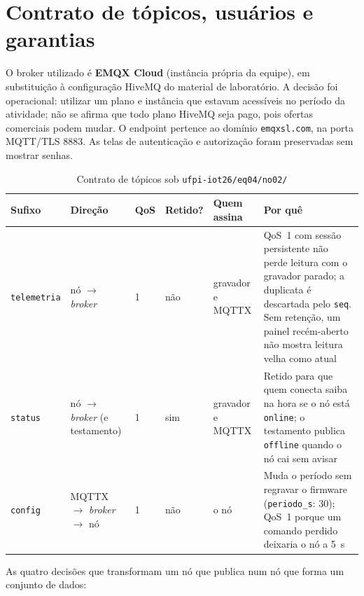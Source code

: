 \section{Contrato de tópicos, usuários e garantias}\label{sec:topicos}
O broker utilizado é \textbf{EMQX Cloud} (instância própria da equipe), em substituição à configuração HiveMQ do material de laboratório. A decisão foi operacional: utilizar um plano e instância que estavam acessíveis no período da atividade; não se afirma que todo plano HiveMQ seja pago, pois ofertas comerciais podem mudar. O endpoint pertence ao domínio \texttt{emqxsl.com}, na porta MQTT/TLS 8883. As telas de autenticação e autorização foram preservadas sem mostrar senhas.
\begin{table}[H]\centering\caption{Contrato de tópicos sob \texttt{ufpi-iot26/eq04/no02/}}\label{tab:topicos}\scriptsize
\setlength{\tabcolsep}{3pt}
\begin{tabular}{@{}L{1.8cm}L{2.3cm}C{0.7cm}C{1.3cm}L{2.4cm}L{5.7cm}@{}}\toprule
\textbf{Sufixo}&\textbf{Direção}&\textbf{QoS}&\textbf{Retido?}&\textbf{Quem assina}&\textbf{Por quê}\\\midrule
\texttt{telemetria}&nó $\to$ \emph{broker}&1&não&gravador e MQTTX&QoS~1 com sessão persistente não perde leitura com o gravador parado; a duplicata é descartada pelo \texttt{seq}. Sem retenção, um painel recém-aberto não mostra leitura velha como atual\\
\texttt{status}&nó $\to$ \emph{broker} (e testamento)&1&sim&gravador e MQTTX&Retido para que quem conecta saiba na hora se o nó está \texttt{online}; o testamento publica \texttt{offline} quando o nó cai sem avisar\\
\texttt{config}&MQTTX $\to$ \emph{broker} $\to$ nó&1&não&o nó&Muda o período sem regravar o firmware (\texttt{periodo\_s}: 30); QoS~1 porque um comando perdido deixaria o nó a 5~s\\
\bottomrule\end{tabular}\end{table}
\noindent As quatro decisões que transformam um nó que publica num nó que forma um conjunto de dados:
